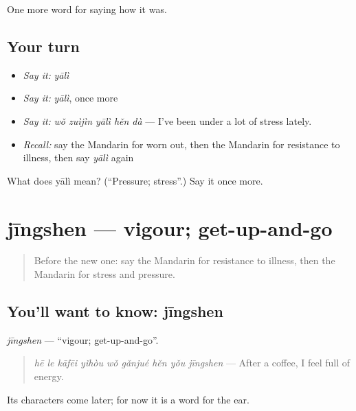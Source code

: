 \begin{grammarlens}[title={What you've built}]
One more word for saying how it was.
\end{grammarlens}

\subsection*{Your turn}
\begin{itemize}
\raggedright
  \item \emph{Say it:} \emph{yālì}
  \item \emph{Say it:} \emph{yālì}, once more
  \item \emph{Say it:} \emph{wǒ zuìjìn yālì hěn dà} — I've been under a lot of stress lately.
  \item \emph{Recall:} say the Mandarin for worn out, then the Mandarin for resistance to illness, then say \emph{yālì} again
\end{itemize}

\begin{tcolorbox}[breakable,colback=teal!4,colframe=teal!35!black,title={Before you move on}]
What does yālì mean? (\textquotedblleft{}Pressure; stress\textquotedblright{}.) Say it once more.
\end{tcolorbox}
\section[jīngshen]{jīngshen — vigour; get-up-and-go}

\label{lesson:ZH-C485-jingshen}



\begin{quote}
Before the new one: say the Mandarin for resistance to illness, then the Mandarin for stress and pressure.
\end{quote}

\subsection*{You'll want to know: jīngshen}
\emph{jīngshen} — \textquotedblleft{}vigour; get-up-and-go\textquotedblright{}.

\begin{quote}
\emph{hē le kāfēi yǐhòu wǒ gǎnjué hěn yǒu jīngshen} — After a coffee, I feel full of energy.
\end{quote}

Its characters come later; for now it is a word for the ear.

